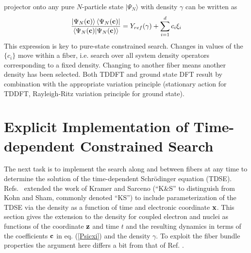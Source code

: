 projector onto any pure $N$-particle state $|\Psi _{N}\rangle $ with density 
$\gamma $ can be written as 
\begin{equation}
\frac{\left| \Psi _{N}({\bf c})\right\rangle \left\langle \Psi _{N}({\bf c}%
)\right| }{\left\langle \Psi _{N}({\bf c})|\Psi _{N}({\bf c})\right\rangle }%
=Y_{ref}(\gamma )+\sum_{i=1}^{d}c_{i}\xi _{i}  \label{Psicxi}
\end{equation}%
This expression is key to pure-state constrained search. Changes in values
of the $\{c_{i}\}$ move within a fiber, i.e. search over all system density
operators corresponding to a fixed density. Changing to another fiber means
another density has been selected. Both TDDFT and ground state DFT result by
combination with the appropriate variation principle (stationary action for
TDDFT, Rayleigh-Ritz variation principle for ground state).

\section{Explicit Implementation of Time-dependent Constrained Search}

\noindent The next task is to implement the search along and between fibers
at any time to determine the solution of the time-dependent Schr\"odinger
equation (TDSE). Refs.~ extended the work of
Kramer and Sarceno \cite{KramSar} (``K\&S'' to distinguish from Kohn and
Sham, commonly denoted ``KS'') to include parameterization of the TDSE via
the density as a function of time and electronic coordinate ${\bf x}$. This
section gives the extension to the density for coupled electron and nuclei
as functions of the coordinate ${\bf z}$ and time $t$ and the resulting
dynamics in terms of the coefficients ${\bf c}$ in eq. (\ref{Psicxi}) and
the density $\gamma$. To exploit the fiber bundle properties the argument
here differs a bit from that of Ref. .

